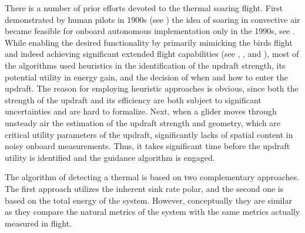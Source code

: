 \documentclass{ifacconf}
\begin{document}
There is a number of prior efforts devoted to the thermal soaring flight.
First demonstrated by human pilots in 1900s (see \cite{Simons:1998}) the idea
of soaring in convective air became feasible for onboard autonomous
implementation only in the 1990s, see \cite{Wharington:1998}. While enabling
the desired functionality by primarily mimicking the birds flight and indeed
achieving significant extended flight capabilities (see \cite{Edwards:2008},
\cite{Allen:2006}, and \cite{Allen:2007}), most of the algorithms used
heuristics in the identification of the updraft strength, its potential
utility in energy gain, and the decision of when and how to enter the
updraft. The reason for employing heuristic approaches is obvious, since both
the strength of the updraft and its efficiency are both subject to
significant uncertainties and are hard to formalize.
Next, when a glider moves through unsteady air the estimation of the updraft
strength and geometry, which are critical utility parameters of the updraft,
significantly lacks of spatial content in noisy onboard measurements. Thus,
it takes significant time before the updraft utility is identified and the
guidance algorithm is engaged.
%
%

The algorithm of detecting a thermal is based on two complementary
approaches. The first approach utilizes the inherent sink rate polar, and the
second one is based on the total energy of the system. However, conceptually
they are similar as they compare the natural metrics of the system with the
same metrics actually measured in flight.

\end{document}
